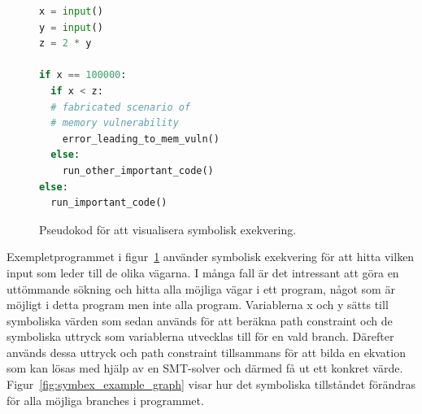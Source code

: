 \begin{figure}
    \begin{lstlisting}[language=Python, frame=single]
x = input()
y = input()
z = 2 * y

if x == 100000:
  if x < z:
  # fabricated scenario of
  # memory vulnerability
    error_leading_to_mem_vuln()
  else:
    run_other_important_code()
else:
  run_important_code()

\end{lstlisting}
    \caption{Pseudokod för att visualisera symbolisk exekvering.}
    \label{fig:symbex_example_code}
\end{figure}

Exempletprogrammet i figur~\ref{fig:symbex_example_code} använder
symbolisk exekvering för att hitta vilken input som leder till de olika
vägarna. I många fall är det intressant att göra en uttömmande
sökning och hitta alla möjliga vägar i ett program, något som är möjligt i detta
program men inte alla program. Variablerna x och y sätts till symboliska värden
som sedan används för att beräkna path constraint och de symboliska uttryck som
variablerna utvecklas till för en vald branch. Därefter används dessa uttryck
och path constraint tillsammans för att bilda en ekvation som kan lösas med
hjälp av en SMT-solver och därmed få ut ett konkret värde.
Figur~\ref{fig:symbex_example_graph} visar hur det symboliska tillståndet
förändras för alla möjliga branches i programmet.

